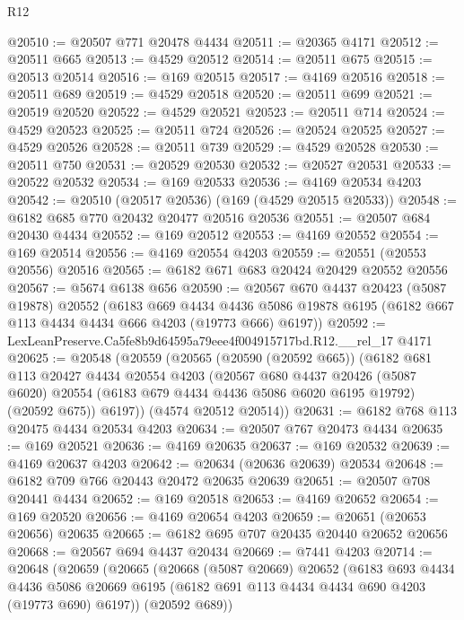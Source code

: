 \begin{lexlean}{R12}
\begin{coremodule}
@20510 := @20507 @771 @20478 @4434
@20511 := @20365 @4171
@20512 := @20511 @665
@20513 := @4529 @20512
@20514 := @20511 @675
@20515 := @20513 @20514
@20516 := @169 @20515
@20517 := @4169 @20516
@20518 := @20511 @689
@20519 := @4529 @20518
@20520 := @20511 @699
@20521 := @20519 @20520
@20522 := @4529 @20521
@20523 := @20511 @714
@20524 := @4529 @20523
@20525 := @20511 @724
@20526 := @20524 @20525
@20527 := @4529 @20526
@20528 := @20511 @739
@20529 := @4529 @20528
@20530 := @20511 @750
@20531 := @20529 @20530
@20532 := @20527 @20531
@20533 := @20522 @20532
@20534 := @169 @20533
@20536 := @4169 @20534 @4203
@20542 := @20510 (@20517 @20536) (@169 (@4529 @20515 @20533))
@20548 := @6182 @685 @770 @20432 @20477 @20516 @20536
@20551 := @20507 @684 @20430 @4434
@20552 := @169 @20512
@20553 := @4169 @20552
@20554 := @169 @20514
@20556 := @4169 @20554 @4203
@20559 := @20551 (@20553 @20556) @20516
@20565 := @6182 @671 @683 @20424 @20429 @20552 @20556
@20567 := @5674 @6138 @656
@20590 := @20567
    @670
    @4437
    @20423
    (@5087 @19878)
    @20552
    (@6183
      @669
      @4434
      @4436
      @5086
      @19878
      @6195
      (@6182 @667 @113 @4434 @4434 @666 @4203 (@19773 @666) @6197))
@20592 := LexLeanPreserve.Ca5fe8b9d64595a79eee4f004915717bd.R12.__rel_17 @4171
@20625 := @20548
    (@20559
      (@20565
        (@20590 (@20592 @665))
        (@6182
          @681
          @113
          @20427
          @4434
          @20554
          @4203
          (@20567
            @680
            @4437
            @20426
            (@5087 @6020)
            @20554
            (@6183 @679 @4434 @4436 @5086 @6020 @6195 @19792)
            (@20592 @675))
          @6197))
      (@4574 @20512 @20514))
@20631 := @6182 @768 @113 @20475 @4434 @20534 @4203
@20634 := @20507 @767 @20473 @4434
@20635 := @169 @20521
@20636 := @4169 @20635
@20637 := @169 @20532
@20639 := @4169 @20637 @4203
@20642 := @20634 (@20636 @20639) @20534
@20648 := @6182 @709 @766 @20443 @20472 @20635 @20639
@20651 := @20507 @708 @20441 @4434
@20652 := @169 @20518
@20653 := @4169 @20652
@20654 := @169 @20520
@20656 := @4169 @20654 @4203
@20659 := @20651 (@20653 @20656) @20635
@20665 := @6182 @695 @707 @20435 @20440 @20652 @20656
@20668 := @20567 @694 @4437 @20434
@20669 := @7441 @4203
@20714 := @20648
    (@20659
      (@20665
        (@20668
          (@5087 @20669)
          @20652
          (@6183
            @693
            @4434
            @4436
            @5086
            @20669
            @6195
            (@6182 @691 @113 @4434 @4434 @690 @4203 (@19773 @690) @6197))
          (@20592 @689))

\end{coremodule}
\end{lexlean}
